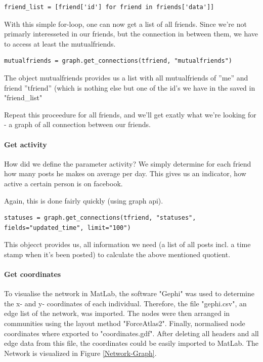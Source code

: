 \begin{lstlisting}
friend_list = [friend['id'] for friend in friends['data']]
\end{lstlisting}

With this simple for-loop, one can now get a list of all friends. Since we're not primarly interesseted in our friends, but the connection in between them, we have to access at least the mutualfriends. 

\begin{lstlisting}
mutualfriends = graph.get_connections(tfriend, "mutualfriends")
\end{lstlisting}

The object mutualfriends provides us a list with all mutualfriends of ''me'' and friend ''tfriend'' (which is nothing else but one of the id's we have in the saved in "friend\_list"

Repeat this proceedure for all friends, and we'll get exatly what we're looking for - a graph of all connection between our friends.

\paragraph{Get activity}

How did we define the parameter activity? We simply determine for each friend how many posts he makes on average per day. This gives us an indicator, how active a certain person is on facebook. 

Again, this is done fairly quickly (using graph api).

\begin{lstlisting}
statuses = graph.get_connections(tfriend, "statuses", fields="updated_time", limit="100")
\end{lstlisting}

This objecct provides us, all information we need (a list of all posts incl. a time stamp when it's been posted) to calculate the above mentioned quotient.

\paragraph{Get coordinates}
To visualise the network in MatLab, the software "Gephi" was used to determine the x- and y- coordinates of each individual. Therefore, the file "gephi.csv", an edge list of the network, was imported. The nodes were then arranged in communities using the layout method "ForceAtlas2". Finally, normalised node coordinates where exported to "coordinates.gdf". After deleting all headers and all edge data from this file, the coordinates could be easily imported to MatLab. The Network is visualized in Figure \ref{Network-Graph}.


